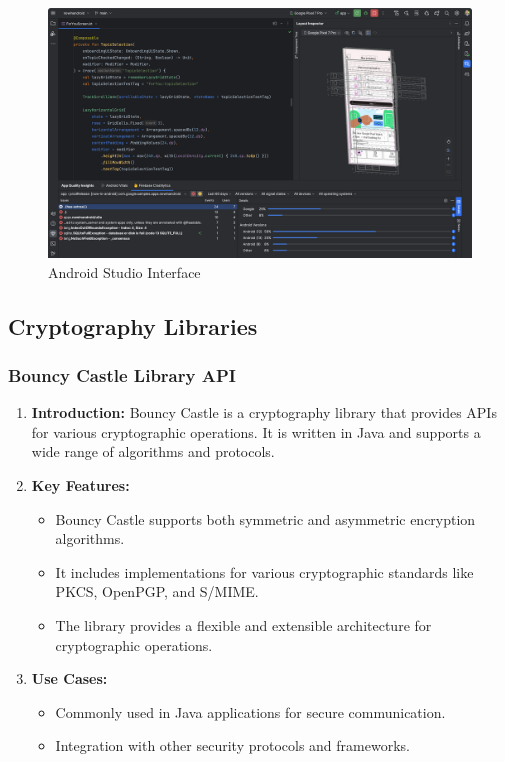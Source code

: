 \documentclass[11pt]{article}
\begin{document}
\begin{enumerate}
          \begin{figure}[H]
              \centering
              \includegraphics[width=.95\textwidth]{android studio/android studio_2.jpg}
              \caption{Android Studio Interface}
          \end{figure}
\end{enumerate}

\subsection{Cryptography Libraries}

\subsubsection{Bouncy Castle Library API}
\begin{enumerate}
    \item \textbf{Introduction:} Bouncy Castle is a cryptography library that provides APIs for various cryptographic operations. It is written in Java and supports a wide range of algorithms and protocols.

    \item \textbf{Key Features:}
          \begin{itemize}
              \item Bouncy Castle supports both symmetric and asymmetric encryption algorithms.
              \item It includes implementations for various cryptographic standards like PKCS,
                    OpenPGP, and S/MIME.
              \item The library provides a flexible and extensible architecture for cryptographic
                    operations.
          \end{itemize}

    \item \textbf{Use Cases:}
          \begin{itemize}
              \item Commonly used in Java applications for secure communication.
              \item Integration with other security protocols and frameworks.
          \end{itemize}

\end{enumerate}
\end{document}
